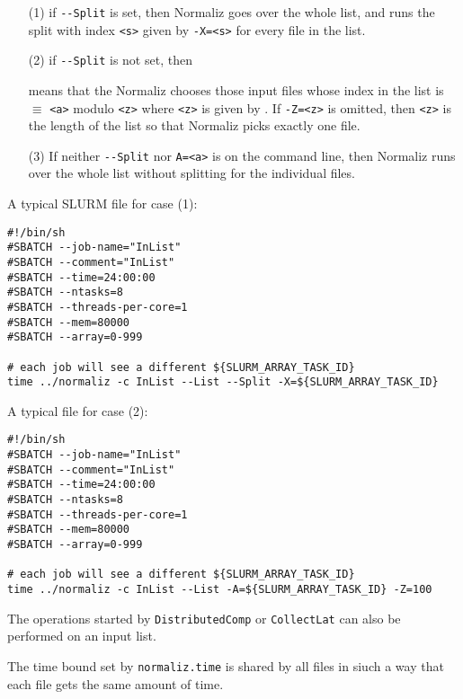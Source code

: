 \begin{enumerate}
\item[(1)] if \verb*|--Split| is set, then Normaliz goes over the whole list, and runs the split with index \verb*|<s>| given by \verb*|-X=<s>| for every file in the list.

\item[(2)] if \verb*|--Split| is not set, then

\begin{itemize}
		means that the Normaliz chooses those input files   whose index in the list is $\equiv$ \verb*|<a>| modulo \verb*|<z>| where \verb*|<z>| is given by
	. If \verb*|-Z=<z>| is omitted, then \verb*|<z>| is the length of the list so that Normaliz picks exactly one file.
\end{itemize}

\item[(3)] If neither \verb*|--Split| nor \verb*|A=<a>| is on the command line, then Normaliz runs over the whole list without splitting for the individual files.
\end{enumerate}

A typical SLURM file for case (1):
\begin{Verbatim}
#!/bin/sh
#SBATCH --job-name="InList"
#SBATCH --comment="InList"
#SBATCH --time=24:00:00
#SBATCH --ntasks=8
#SBATCH --threads-per-core=1
#SBATCH --mem=80000
#SBATCH --array=0-999

# each job will see a different ${SLURM_ARRAY_TASK_ID}
time ../normaliz -c InList --List --Split -X=${SLURM_ARRAY_TASK_ID}
\end{Verbatim}

A typical file for case (2):
\begin{Verbatim}
#!/bin/sh
#SBATCH --job-name="InList"
#SBATCH --comment="InList"
#SBATCH --time=24:00:00
#SBATCH --ntasks=8
#SBATCH --threads-per-core=1
#SBATCH --mem=80000
#SBATCH --array=0-999

# each job will see a different ${SLURM_ARRAY_TASK_ID}
time ../normaliz -c InList --List -A=${SLURM_ARRAY_TASK_ID} -Z=100
\end{Verbatim}
	
The operations started by \verb*|DistributedComp| or \verb*|CollectLat| can also be performed on an input list.

The time bound set by \verb*|normaliz.time| is shared by all files in siuch a way that each file gets the same amount of time.

\newpage

